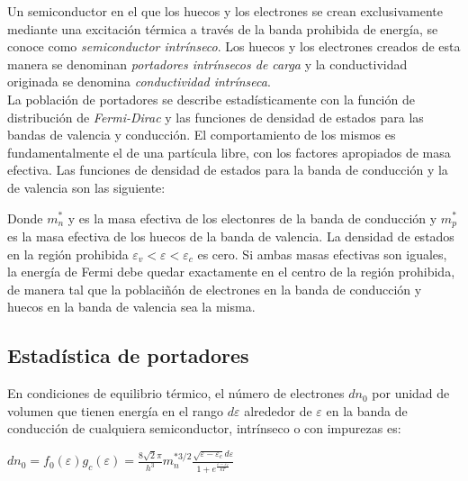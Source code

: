 \documentclass[oneside]{book}
\numberwithin{equation}{section}
\numberwithin{figure}{section}
\numberwithin{table}{section}
\begin{document}
		Un semiconductor en el que los huecos y los electrones se crean exclusivamente mediante una excitación térmica a través de la banda prohibida de energía, se conoce como \textit{semiconductor intrínseco}. Los huecos y los electrones creados de esta manera se denominan \textit{portadores intrínsecos de carga} y la conductividad originada se denomina \textit{conductividad intrínseca}.\\
		
		La población de portadores se describe estadísticamente con la función de distribución de \textit{Fermi-Dirac} y las funciones de densidad de estados para las bandas de valencia y conducción. El comportamiento de los mismos es fundamentalmente el de una partícula libre, con los factores apropiados de masa efectiva. Las funciones de densidad de estados para la banda de conducción y la de valencia son las siguiente:

				\begin{center}
					
				\end{center}
			
			Donde $m_n^*$ y es la masa efectiva de los electonres de la banda de conducción y $m_p^*$ es la masa efectiva de los huecos de la banda de valencia. La densidad de estados en la región prohibida $\varepsilon_v<\varepsilon<\varepsilon_c$ es cero. Si ambas masas efectivas son iguales, la energía de Fermi debe quedar exactamente en el centro de la región prohibida, de manera tal que la poblaciñón de electrones en la banda de conducción y huecos en la banda de valencia sea la misma.

			\subsection{Estadística de portadores}
			
			En condiciones de equilibrio térmico, el número de electrones $dn_0$ por unidad de volumen que tienen energía en el rango $d\varepsilon$ alrededor de $\varepsilon$ en la banda de conducción de cualquiera semiconductor, intrínseco o con impurezas es:\\
			
			\begin{center}
			$\displaystyle dn_0=f_0(\varepsilon)g_c(\varepsilon)=\frac{8\sqrt{2}\pi}{h^3}m_n^{*3/2}\frac{\sqrt{\varepsilon-\varepsilon_c}d\varepsilon}{1+e^{\frac{\varepsilon-\varepsilon_f}{kT}}}$
			\end{center}
			
\end{document}
